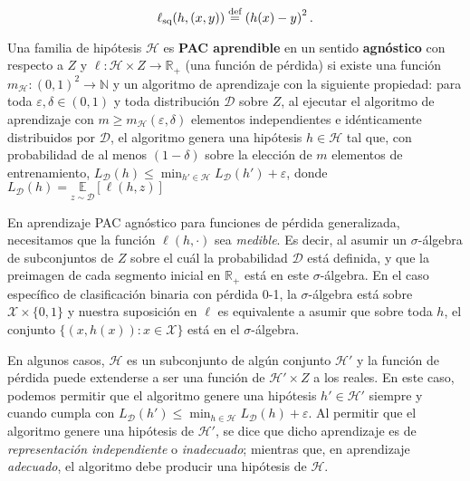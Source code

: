 \documentclass[8pt,a4paper]{extarticle}
\begin{document}
\begin{multicols}{3}
	\begin{boxdef}
		\[
			\ell_{\text{\normalfont sq}} (h, (x,y)) \stackrel{\text{\normalfont def}}{=} \left( h(x) - y \right)^2
			.\]
	\end{boxdef}

	\begin{boxdef}
		Una familia de hipótesis $\mathcal{H}$ es \textbf{PAC aprendible} en un sentido \textbf{agnóstico} con respecto a $Z$ y $\ell: \mathcal{H}\times Z \to \mathbb{R}_{+}$ (una función de pérdida) si existe una función $m_{\mathcal{H}} : (0,1)^2 \to \mathbb{N}$ y un algoritmo de aprendizaje con la siguiente propiedad: \textcolor{dred}{para toda $\varepsilon, \delta \in (0,1)$ y toda distribución $\mathcal{D}$ sobre $Z$, al ejecutar el algoritmo de aprendizaje con $m \ge m_{\mathcal{H}} (\varepsilon, \delta)$ elementos independientes e idénticamente distribuidos por $\mathcal{D}$, el algoritmo genera una hipótesis $h \in \mathcal{H}$ tal que, con probabilidad de al menos  $(1 - \delta)$ sobre la elección de $m$ elementos de entrenamiento, $L_{\mathcal{D}} (h) \le \min_{h' \in \mathcal{H}} L_{\mathcal{D}} (h') + \varepsilon$, donde $L_{\mathcal{D}} (h) = \underset{z\sim \mathcal{D}}{\mathbb{E}} [\ell (h,z)]$}
	\end{boxdef}

	\begin{boxrmk}[]
		En aprendizaje PAC agnóstico para funciones de pérdida generalizada, necesitamos que la función $ \ell (h,\cdot)$ sea \emph{medible}. Es decir, al asumir un $\sigma$-álgebra de subconjuntos de  $Z$ sobre el cuál la probabilidad  $\mathcal{D}$ está definida, y que la preimagen de cada segmento inicial en $\mathbb{R}_{+}$ está en este $\sigma$-álgebra. \textcolor{dgray}{En el caso específico de clasificación binaria con pérdida 0-1, la  $\sigma$-álgebra está sobre  $ \mathcal{X} \times \{0,1\} $ y nuestra suposición en $ \ell$ es equivalente a asumir que sobre toda $h$, el conjunto  $ \{(x, h(x)) : x \in \mathcal{X}\} $ está en el $\sigma$-álgebra.}
	\end{boxrmk}

	\begin{boxrmk}
		En algunos casos, $\mathcal{H}$ es un subconjunto de algún conjunto $\mathcal{H}'$ y la función de pérdida puede extenderse a ser una función de $\mathcal{H}' \times Z$ a los reales. En este caso, podemos permitir que el algoritmo genere una hipótesis $h' \in \mathcal{H}'$ siempre y cuando cumpla con $L_{\mathcal{D}} (h') \le \min_{h \in \mathcal{H}} L_{\mathcal{D}} (h) + \varepsilon$. Al permitir que el algoritmo genere una hipótesis de $\mathcal{H}'$, se dice que dicho aprendizaje es de \emph{representación independiente} o \emph{inadecuado}; mientras que, en aprendizaje \emph{adecuado}, el algoritmo debe producir una hipótesis de $\mathcal{H}$.
	\end{boxrmk}


\end{multicols}
\end{document}
